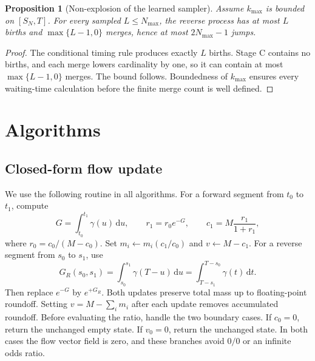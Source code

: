 \documentclass[10pt]{article}
\newtheorem{proposition}[theorem]{Proposition}
\theoremstyle{definition}
\theoremstyle{remark}
\newcommand{\dd}{\,\mathrm{d}}
\begin{document}
\begin{proposition}[Non-explosion of the learned sampler]
\label{prop:reverse-nonexplosion}
Assume $k_{\max}$ is bounded on $[S_N,T]$.  For every sampled
$L\leq N_{\max}$, the reverse process has at most $L$ births and
$\max\{L-1,0\}$ merges, hence at most $2N_{\max}-1$ jumps.
\end{proposition}

\begin{proof}
The conditional timing rule produces exactly $L$ births.  Stage C contains
no births, and each merge lowers cardinality by one, so it can contain at
most $\max\{L-1,0\}$ merges.  The bound follows.  Boundedness of $k_{\max}$
ensures every waiting-time calculation before the finite merge count is
well defined.
\end{proof}

\section{Algorithms}
\label{sec:algorithms}

\subsection{Closed-form flow update}

We use the following routine in all algorithms.  For a forward segment from
$t_0$ to $t_1$, compute
\begin{equation}
  G=\int_{t_0}^{t_1}\gamma(u)\dd u,
  \qquad r_1=r_0e^{-G},
  \qquad c_1=M\frac{r_1}{1+r_1},
  \label{eq:flow-update-forward}
\end{equation}
where $r_0=c_0/(M-c_0)$.  Set $m_i\leftarrow m_i(c_1/c_0)$ and
$v\leftarrow M-c_1$.  For a reverse segment from $s_0$ to $s_1$, use
\begin{equation}
  G_R(s_0,s_1)
  =\int_{s_0}^{s_1}\gamma(T-u)\dd u
  =\int_{T-s_1}^{T-s_0}\gamma(t)\dd t.
  \label{eq:reverse-flow-integral}
\end{equation}
Then replace $e^{-G}$ by $e^{+G_R}$.  Both updates preserve total mass up to
floating-point roundoff.  Setting $v=M-\sum_i m_i$ after each update removes
accumulated roundoff.
Before evaluating the ratio, handle the two boundary cases.  If $c_0=0$,
return the unchanged empty state.  If $v_0=0$, return the unchanged state.
In both cases the flow vector field is zero, and these branches avoid $0/0$
or an infinite odds ratio.
\end{document}
